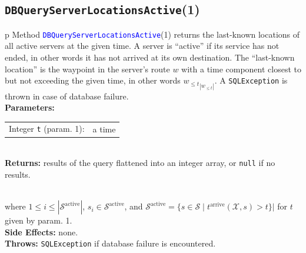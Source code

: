 \subsection{\texttt{DBQueryServerLocationsActive}(1)}
\begin{tabular}{p{\textwidth}}
\toprule
{}
Method \textcolor{blue}{{\tt{}\protect{}DBQueryServerLocationsActive}}(1) returns the
last-known locations of all active servers at the given time. A server is
``active'' if its service has not ended, in other words it has not arrived
at its own destination.
The ``last-known location'' is the waypoint in the server's route $w$
with a time component closest to but not exceeding the given time, in other
words ${w_{\leq t}}_{|w_{\leq t}|}$.
A {\tt{}SQLException} is thrown in case of database failure.\\
\midrule
\textbf{Parameters:} \\
\begin{tabular}{lp{116mm}}
Integer {\tt{}t} (param. 1):&a time
\end{tabular}\\
\textbf{Returns:} results of the query flattened into an integer array, or
{\tt{}null} if no results.

\\

where $1\leq i\leq |\mathcal{S}^\textrm{active}|$,
$s_i\in \mathcal{S}^\textrm{active}$, and
$\mathcal{S}^\textrm{active}= \{s\in\mathcal{S}\mid t^\textrm{arrive}(\mathcal{X},s)>t\}|$
for $t$ given by param. 1.\\
\textbf{Side Effects:} none.\\
\textbf{Throws:} {\tt{}SQLException} if database failure is encountered.\\
\bottomrule
\end{tabular}
\nwenddocs{}\endmoddef{}
